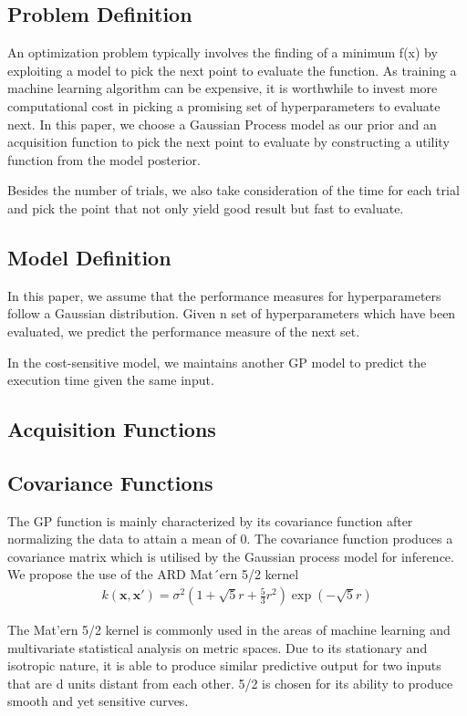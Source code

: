 \documentclass[letterpaper]{article}
\begin{document}
\subsection{Problem Definition}
An optimization problem typically involves the finding of a minimum f(x) by exploiting a model to pick the next point to evaluate the function. As training a machine learning algorithm can be expensive, it is worthwhile to invest more computational cost in picking a promising set of hyperparameters to evaluate next. In this paper, we choose a Gaussian Process model as our prior and an acquisition function to pick the next point to evaluate by constructing a utility function from the model posterior. 

Besides the number of trials, we also take consideration of the time for each trial and pick the point that not only yield good result but fast to evaluate.

\subsection{Model Definition}
In this paper, we assume that the performance measures for hyperparameters follow a Gaussian distribution. Given n set of hyperparameters which have been evaluated, we predict the performance measure of the next set.

In the cost-sensitive model, we maintains another GP model to predict the execution time given the same input.

\subsection{Acquisition Functions}

\subsection{Covariance Functions}
The GP function is mainly characterized by its covariance function after normalizing the data to attain a mean of 0. The covariance function produces a covariance matrix which is utilised by the Gaussian process model for inference.
We propose the use of the ARD Mat´ern 5/2 kernel
\begin{align*}
	k (\textbf{x},\textbf{x}') = \sigma^2(1+\sqrt5r+\frac{5}{3}r^2)\exp(-\sqrt5r)
\end{align*}

The Mat'ern 5/2 kernel is commonly used in the areas of machine learning and multivariate statistical analysis on metric spaces. Due to its stationary and isotropic nature, it is able to produce similar predictive output for two inputs that are d units distant from each other. 5/2 is chosen for its ability to produce smooth and yet sensitive curves.
\end{document}
